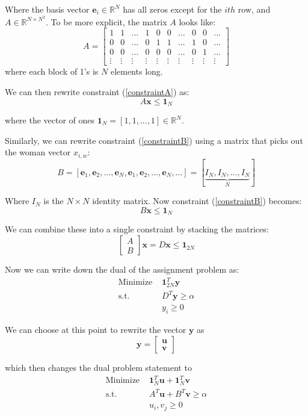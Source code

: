 \documentclass[twoside]{article}
\begin{document}
Where the basis vector $\textbf{e}_i \in \mathbb{R}^N$ has all zeros except for the $ith$ row, and $A \in \mathbb{R}^{N\times N^2}$. To be more explicit, the matrix $A$ looks like:
\[
A = \begin{bmatrix}
1 & 1 & ...& 1 & 0 & 0 & ... & 0 & 0 & ...\\
0 & 0 & ...& 0 & 1 & 1 & ... & 1 & 0 & ... \\
0 & 0 & ...& 0 & 0 & 0 & ... & 0 & 1 & ... \\
\vdots & \vdots & \vdots & \vdots & \vdots & \vdots & \vdots & \vdots & \vdots & \vdots
\end{bmatrix}
\]
where each block of 1's is $N$ elements long.

We can then rewrite constraint (\ref{constraintA}) as:
\[
A\textbf{x} \leq \textbf{1}_N
\]

where the vector of ones $\textbf{1}_N = [1, 1, ..., 1] \in \mathbb{R}^N$.

Similarly, we can rewrite constraint (\ref{constraintB}) using a matrix that picks out the woman vector $x_{i,w}$:
\[
B = [\textbf{e}_1, \textbf{e}_2, ..., \textbf{e}_N, \textbf{e}_1, \textbf{e}_2, ..., \textbf{e}_N, ...] = [\underbrace{I_N, I_N, ..., I_N}_N]
\]

Where $I_N$ is the $N\times N$ identity matrix. Now constraint (\ref{constraintB}) becomes:
\[
B\textbf{x} \leq \textbf{1}_N
\]

We can combine these into a single constraint by stacking the matrices:
\[
\begin{bmatrix} 
A \\
B
\end{bmatrix}\textbf{x} = D\textbf{x}\leq \textbf{1}_{2N} 
\]

Now we can write down the dual of the assignment problem as:
\begin{align*}
    \text{Minimize } &\textbf{1}_{2N}^{T}\textbf{y}\\
    \text{s.t. }&D^T\textbf{y} \geq \alpha\\
    & y_i \geq 0
\end{align*}

We can choose at this point to rewrite the vector $\textbf{y}$ as 
\[
\textbf{y} = \begin{bmatrix}
\textbf{u}\\
\textbf{v}
\end{bmatrix}
\]

which then changes the dual problem statement to
\begin{align*}
    \text{Minimize } &\textbf{1}_{N}^{T}\textbf{u} +\textbf{1}_{N}^{T}\textbf{v} \\
    \text{s.t. }&A^T\textbf{u} + B^T\textbf{v} \geq \alpha\\
    & u_i, v_j \geq 0
\end{align*}
\end{document}
